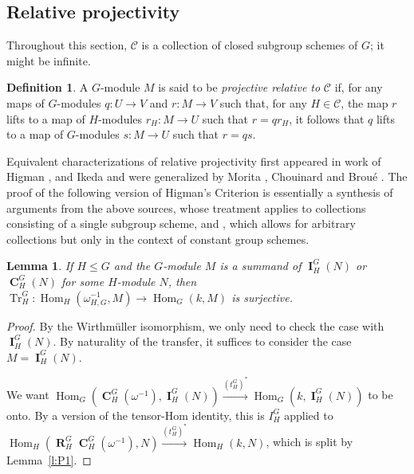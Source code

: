 \documentclass[12pt]{amsart}
\newtheorem{lemma}[theorem]{Lemma}
\theoremstyle{definition}
\newtheorem{definition}[theorem]{Definition}
\DeclareMathOperator{\ind}{\mathbf{I}}
\DeclareMathOperator{\coind}{\mathbf{C}}
\DeclareMathOperator{\res}{\mathbf{R}}
\DeclareMathOperator{\Hom}{Hom}
\DeclareMathOperator{\Tr}{Tr}
\begin{document}
\subsection{Relative projectivity}\label{sec:Higman}
Throughout this section, $\mathcal{C}$ is a collection of closed subgroup schemes of $G$; it might be infinite.

\begin{definition}\label{def:relproj}
A $G$-module $M$ is said to be {\em projective relative to} $\mathcal{C}$ if, for any maps of $G$-modules $q \! : U \rightarrow V$ and $r \! : M \rightarrow V$ such that, for any $H \in \mathcal{C}$, the map $r$ lifts to a map of $H$-modules $r_H \! : M \rightarrow U$ such that $r=qr_H$, it follows that $q$ lifts to a map of $G$-modules $s \! : M \rightarrow U$ such that $r=qs$.  
\end{definition}

 Equivalent characterizations of relative projectivity first appeared in work of Higman \cite{MR67895}, \cite{MR87671} and Ikeda \cite{MR55326} and were generalized by Morita \cite{MR190183}, Chouinard \cite{MR585205} and Brou\'e \cite{MR2526081}. The proof of the following version of Higman's Criterion is essentially a synthesis of arguments from the above sources, whose treatment applies to collections consisting of a single subgroup scheme, and
 \cite[3.5.8]{MR2266036}, which allows for arbitrary collections but only in the context of constant group schemes.
 
 \begin{lemma}\label{l:P2} If $H \leq G$ and the $G$-module $M$ is a summand of $\ind^G_H(N)$ or $\coind^G_H(N)$ for some $H$-module $N$, then $\Tr _H^G  \! : \Hom_H( \omega^{-1}_{H,G}, M) \rightarrow \Hom_G(k,M)$ is surjective.
 	\end{lemma}
 	
 	\begin{proof}
 		By the Wirthm\"{u}ller isomorphism, we only need to check the case with $\ind^G_H(N)$. By naturality of the transfer, it suffices to consider the case $M=\ind^G_H(N)$.
 		
 		We want $\Hom_G(\coind^G_H( \omega ^{-1}),\ind^G_H(N)) \xrightarrow{(t^G_H)^*} \Hom_G(k, \ind^G_H(N))$ to be onto. By a version of the tensor-Hom identity, this is $I^G_H$ applied to $\Hom_H(\res^G_H \coind^G_H( \omega ^{-1}),N) \xrightarrow{(t^G_H)^*} \Hom_H(k, N)$, which is split by Lemma~\ref{l:P1}.
 	\end{proof}
\end{document}
